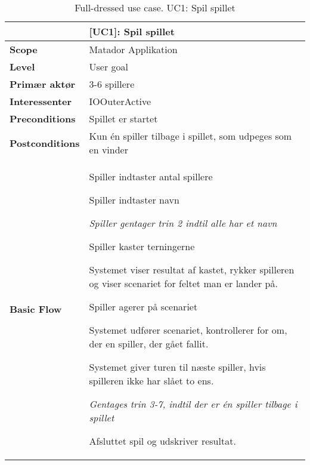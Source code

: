 \documentclass[class=article, crop=false]{standalone}
\makeatletter
\let\savespace\@minipagetrue
\makeatother
\begin{document}
    \begin{table}[H]
        \caption{Full-dressed use case. UC1: Spil spillet}
        \begin{tabularx}{\textwidth}{|l|X|}
            \hline
                                         & \textbf{[UC1]: Spil spillet}   \\ \hline
            \textbf{Scope}               & Matador Applikation\\ \hline
            \textbf{Level}               & User goal     \\ \hline
            \textbf{Primær aktør}        & 3-6 spillere  \\ \hline
            \textbf{Interessenter}       & IOOuterActive\\ \hline
            \textbf{Preconditions}       & Spillet er startet \\ \hline
            \textbf{Postconditions}      & Kun én spiller tilbage i spillet,
                                           som udpeges som en vinder\\ \hline





            \textbf{Basic Flow} & \begin{tabenum}
                          \item Spiller indtaster antal spillere
                          \item Spiller indtaster navn
                              \savespace
                                \begin{compactitem}
                                    \item \textit{Spiller gentager trin 2                                                             indtil alle har et navn}
                          \end{compactitem}
                              \item Spiller kaster terningerne
                              \item Systemet viser resultat af kastet, rykker spilleren og viser scenariet for feltet man er lander på.
                              \item Spiller agerer på scenariet
                              \item Systemet udfører scenariet, kontrollerer for om, der en spiller, der gået fallit.
                          \item Systemet giver turen til næste spiller, hvis spilleren ikke har slået to ens.
                          \savespace
                          \begin{compactitem}
                              \item \textit{Gentages trin 3-7, indtil der er én spiller tilbage i spillet}
                          \end{compactitem}
                              \item Afsluttet spil og udskriver resultat.
                           \end{tabenum}   \\ \hline





\end{tabularx}
\end{table}
\end{document}
